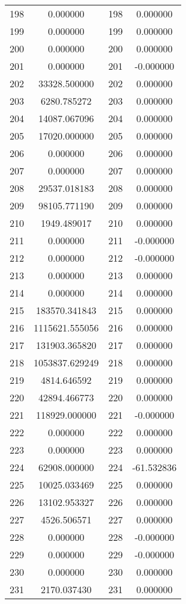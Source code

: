 \documentclass[12pt]{article}
\begin{document}
\begin{longtable}{@{}cccc@{}}
198 & 0.000000 & 198 & 0.000000 \\
199 & 0.000000 & 199 & 0.000000 \\
200 & 0.000000 & 200 & 0.000000 \\
201 & 0.000000 & 201 & -0.000000 \\
202 & 33328.500000 & 202 & 0.000000 \\
203 & 6280.785272 & 203 & 0.000000 \\
204 & 14087.067096 & 204 & 0.000000 \\
205 & 17020.000000 & 205 & 0.000000 \\
206 & 0.000000 & 206 & 0.000000 \\
207 & 0.000000 & 207 & 0.000000 \\
208 & 29537.018183 & 208 & 0.000000 \\
209 & 98105.771190 & 209 & 0.000000 \\
210 & 1949.489017 & 210 & 0.000000 \\
211 & 0.000000 & 211 & -0.000000 \\
212 & 0.000000 & 212 & -0.000000 \\
213 & 0.000000 & 213 & 0.000000 \\
214 & 0.000000 & 214 & 0.000000 \\
215 & 183570.341843 & 215 & 0.000000 \\
216 & 1115621.555056 & 216 & 0.000000 \\
217 & 131903.365820 & 217 & 0.000000 \\
218 & 1053837.629249 & 218 & 0.000000 \\
219 & 4814.646592 & 219 & 0.000000 \\
220 & 42894.466773 & 220 & 0.000000 \\
221 & 118929.000000 & 221 & -0.000000 \\
222 & 0.000000 & 222 & 0.000000 \\
223 & 0.000000 & 223 & 0.000000 \\
224 & 62908.000000 & 224 & -61.532836 \\
225 & 10025.033469 & 225 & 0.000000 \\
226 & 13102.953327 & 226 & 0.000000 \\
227 & 4526.506571 & 227 & 0.000000 \\
228 & 0.000000 & 228 & -0.000000 \\
229 & 0.000000 & 229 & -0.000000 \\
230 & 0.000000 & 230 & 0.000000 \\
231 & 2170.037430 & 231 & 0.000000 \\

\end{longtable}
\end{document}
